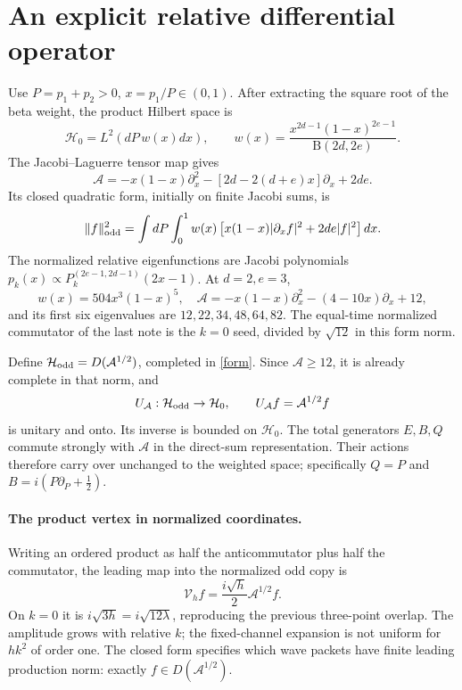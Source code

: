 \documentclass[11pt,a4paper]{article}
\newcommand{\Aop}{\mathcal A}
\newcommand{\HH}{\mathcal H}
\begin{document}
\newpage
\section{An explicit relative differential operator}
Use $P=p_1+p_2>0$, $x=p_1/P\in(0,1)$. After extracting the square root
of the beta weight, the product Hilbert space is
\begin{equation}
 \HH_0=L^2(dP\,w(x)dx),\qquad
 w(x)=\frac{x^{2d-1}(1-x)^{2e-1}}{\mathrm B(2d,2e)}.
\end{equation}
The Jacobi--Laguerre tensor map \cite{KV,local} gives
\begin{equation}
 \Aop=-x(1-x)\partial_x^2-[2d-2(d+e)x]\partial_x+2de.\label{diff}
\end{equation}
Its closed quadratic form, initially on finite Jacobi sums, is
\begin{equation}
 \|f\|_{\rm odd}^2=\int dP\int_0^1w(x)
 \left[x(1-x)|\partial_x f|^2+2de|f|^2\right]dx.\label{form}
\end{equation}
The normalized relative eigenfunctions are Jacobi polynomials
$p_k(x)\propto P_k^{(2e-1,2d-1)}(2x-1)$. At $d=2,e=3$,
\[
 w(x)=504x^3(1-x)^5,\quad
 \Aop=-x(1-x)\partial_x^2-(4-10x)\partial_x+12,
\]
and its first six eigenvalues are $12,22,34,48,64,82$.
The equal-time normalized commutator of the last note is the $k=0$
seed, divided by $\sqrt{12}$ in this form norm.

Define $\HH_{\rm odd}=D(\Aop^{1/2})$, completed in \eqref{form}.
Since $\Aop\ge12$, it is already complete in that norm, and
\begin{equation}
 U_{\Aop}:\HH_{\rm odd}\to\HH_0,\qquad U_{\Aop}f=\Aop^{1/2}f
\end{equation}
is unitary and onto. Its inverse is bounded on $\HH_0$.
The total generators $E,B,Q$ commute strongly with $\Aop$ in the
direct-sum representation. Their actions therefore carry over unchanged
to the weighted space; specifically
$Q=P$ and $B=i(P\partial_P+\tfrac12)$.

\paragraph{The product vertex in normalized coordinates.}
Writing an ordered product as half the anticommutator plus half the
commutator, the leading map into the normalized odd copy is
\begin{equation}
 \mathcal V_h f=\frac{i\sqrt h}{2}\Aop^{1/2}f.\label{vertex}
\end{equation}
On $k=0$ it is $i\sqrt{3h}=i\sqrt{12\lambda}$, reproducing the
previous three-point overlap. The amplitude grows with relative $k$;
the fixed-channel expansion is not uniform for $hk^2$ of order one.
The closed form specifies which wave packets have finite leading
production norm: exactly $f\in D(\Aop^{1/2})$.
\end{document}

